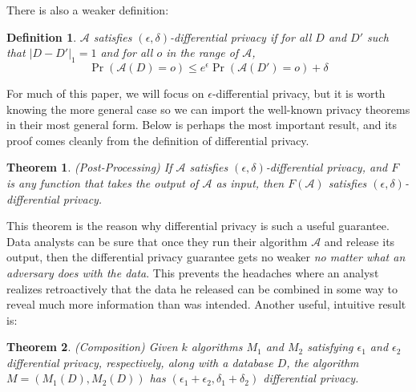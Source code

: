 \documentclass[11pt]{article}
\newtheorem{theorem}{Theorem}
\newtheorem{defn}{Definition}
\begin{document}
There is also a weaker definition: 

\begin{defn}
$\mathcal{A}$ satisfies $(\epsilon, \delta)$-differential privacy if for all $D$ and $D'$ such that $|D-D'|_1=1$ and for all $o$ in the range of $\mathcal{A}$, 
\[\Pr\left(\mathcal{A}(D) = o \right) \leq e^{\epsilon} \Pr\left(\mathcal{A}(D')=o \right) + \delta\]
\end{defn}

For much of this paper, we will focus on $\epsilon$-differential privacy, but it is worth knowing the more general case so we can import the well-known privacy theorems in their most general form. Below is perhaps the most important result, and its proof comes cleanly from the definition of differential privacy.

\begin{theorem}
(Post-Processing) If $\mathcal{A}$ satisfies $(\epsilon, \delta)$-differential privacy, and $F$ is any function that takes the output of $\mathcal{A}$ as input, then $F(\mathcal{A})$ satisfies $(\epsilon, \delta)$-differential privacy.
\end{theorem}
This theorem is the reason why differential privacy is such a useful guarantee. Data analysts can be sure that once they run their algorithm $\mathcal{A}$ and release its output, then the differential privacy guarantee gets no weaker \emph{no matter what an adversary does with the data}. This prevents the headaches where an analyst realizes retroactively that the data he released can be combined in some way to reveal much more information than was intended. Another useful, intuitive result is:

\begin{theorem} \label{thm:comp}
(Composition) Given $k$ algorithms $M_1$ and $M_2$ satisfying $\epsilon_1$ and $\epsilon_2$ differential privacy, respectively, along with a database $D$, the algorithm $M = (M_1(D), M_2(D))$ has $(\epsilon_1+\epsilon_2, \delta_1+\delta_2)$ differential privacy.
\end{theorem}
\end{document}
